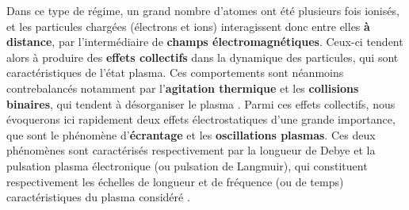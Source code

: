 \begin{refsection}
Dans ce type de régime, un grand nombre d'atomes ont été plusieurs fois ionisés, et les particules chargées (électrons et ions) interagissent donc entre elles \textbf{à distance}, par l'intermédiaire de \textbf{champs électromagnétiques}. 
Ceux-ci tendent alors à produire des \textbf{effets collectifs} dans la dynamique des particules, qui sont caractéristiques de l'état plasma. Ces comportements sont néanmoins contrebalancés notamment par l'\textbf{agitation thermique} et les \textbf{collisions binaires}, qui tendent à désorganiser le plasma \parencite{rax_2007}. Parmi ces effets collectifs, nous évoquerons ici rapidement deux effets électrostatiques d'une grande importance, que sont le phénomène d'\textbf{écrantage} et les \textbf{oscillations plasmas}. Ces deux phénomènes sont caractérisés respectivement par la longueur de Debye et la pulsation plasma électronique (ou pulsation de Langmuir), qui constituent respectivement les échelles de longueur et de fréquence (ou de temps) caractéristiques du plasma considéré \parencite{rax_2007}.


\end{refsection}
